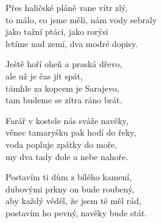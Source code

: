 
\ve{}
Přes haličské pláně vane vítr zlý,\\
to málo, co jsme měli, nám vody sebraly\\
jako tažní ptáci, jako rorýsi\\
letíme nad zemí, dva modré dopisy.

\cho{}
Ještě hoří oheň a praská dřevo,\\
ale už je čas jít spát, \\
támhle za kopcem je Sarajevo,\\
tam budeme se zítra ráno brát.

\ve{}
Farář v kostele nás sváže navěky,\\
věnec tamaryšku pak hodí do řeky,\\
voda popluje zpátky do moře,\\
my dva tady dole a nebe nahoře.

\cho{}

\ve{}
Postavím ti dům z bílého kamení,\\
dubovými prkny on bude roubený,\\
aby každý věděl, že jsem tě měl rád,\\
postavím ho pevný, navěky bude stát.

\cho{}

\esong